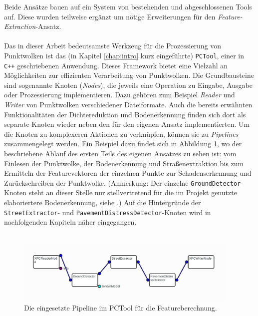 Beide Ansätze bauen auf ein System von bestehenden und abgeschlossenen Tools auf. Diese wurden teilweise ergänzt um nötige Erweiterungen für den \textit{Feature-Extraction}-Ansatz. \\\\
Das in dieser Arbeit bedeutsamste Werkzeug für die Prozessierung von Punktwolken ist das (in Kapitel \ref{chap:intro} kurz eingeführte) \texttt{PCTool}, einer in \texttt{C++} geschriebenen Anwendung. Dieses Framework bietet eine Vielzahl an Möglichkeiten zur effizienten Verarbeitung von Punktwolken. Die Grundbausteine sind sogenannte Knoten (\textit{Nodes}), die jeweils eine Operation zu Eingabe, Ausgabe oder Prozessierung implementieren. Dazu gehören zum Beispiel \textit{Reader} und \textit{Writer} von Punktwolken verschiedener Dateiformate. Auch die bereits erwähnten Funktionalitäten der Dichtereduktion und Bodenerkennung finden sich dort als separate Knoten wieder neben den für den eigenen Ansatz implementierten. Um die Knoten zu komplexeren Aktionen zu verknüpfen, können sie zu \textit{Pipelines} zusammengelegt werden. Ein Beispiel dazu findet sich in Abbildung \ref{fig:pcr_pipeline}, wo der beschriebene Ablauf des ersten Teils des eigenen Ansatzes zu sehen ist: vom Einlesen der Punktwolke, der Bodenerkennung und Straßenextraktion bis zum Ermitteln der Featurevektoren der einzelnen Punkte zur Schadenserkennung und Zurückschreiben der Punktwolke. (Anmerkung: Der einzelne \texttt{GroundDetector}-Knoten steht an dieser Stelle nur stellvertretend für die im Projekt genutzte elaboriertere Bodenerkennung, siehe \cite{Mattes-2021}.) Auf die Hintergründe der \texttt{StreetExtractor}- und \texttt{PavementDistressDetector}-Knoten wird in nachfolgenden Kapiteln näher eingegangen. \\\\

\begin{figure}[!ht]
    \centering
    \includegraphics[width=0.95\textwidth]{graphics/pcr_pipeline}
    \caption{Die eingesetzte Pipeline im PCTool für die Featureberechnung.}
    \label{fig:pcr_pipeline}
\end{figure}

